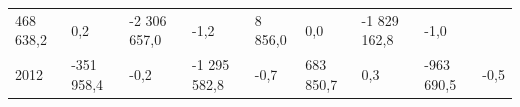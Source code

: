 \begin{longtable}[]{@{}lllllllll@{}}
\begin{minipage}[t]{0.10\columnwidth}
468 638,2\strut
\end{minipage} & \begin{minipage}[t]{0.06\columnwidth}\raggedright
0,2\strut
\end{minipage} & \begin{minipage}[t]{0.16\columnwidth}\raggedright
-2 306 657,0\strut
\end{minipage} & \begin{minipage}[t]{0.06\columnwidth}\raggedright
-1,2\strut
\end{minipage} & \begin{minipage}[t]{0.12\columnwidth}\raggedright
8 856,0\strut
\end{minipage} & \begin{minipage}[t]{0.06\columnwidth}\raggedright
0,0\strut
\end{minipage} & \begin{minipage}[t]{0.10\columnwidth}\raggedright
-1 829 162,8\strut
\end{minipage} & \begin{minipage}[t]{0.06\columnwidth}\raggedright
-1,0\strut
\end{minipage}\tabularnewline
\begin{minipage}[t]{0.05\columnwidth}\raggedright
2012\strut
\end{minipage} & \begin{minipage}[t]{0.10\columnwidth}\raggedright
-351 958,4\strut
\end{minipage} & \begin{minipage}[t]{0.06\columnwidth}\raggedright
-0,2\strut
\end{minipage} & \begin{minipage}[t]{0.16\columnwidth}\raggedright
-1 295 582,8\strut
\end{minipage} & \begin{minipage}[t]{0.06\columnwidth}\raggedright
-0,7\strut
\end{minipage} & \begin{minipage}[t]{0.12\columnwidth}\raggedright
683 850,7\strut
\end{minipage} & \begin{minipage}[t]{0.06\columnwidth}\raggedright
0,3\strut
\end{minipage} & \begin{minipage}[t]{0.10\columnwidth}\raggedright
-963 690,5\strut
\end{minipage} & \begin{minipage}[t]{0.06\columnwidth}\raggedright
-0,5\strut
\end{minipage}\tabularnewline

\end{longtable}
